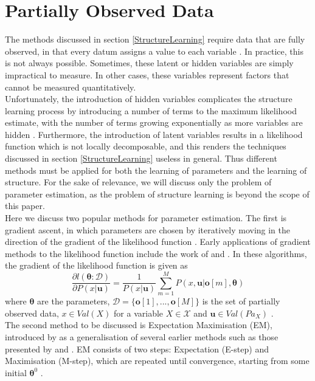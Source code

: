 \documentclass [11pt]{article}
\begin{document}
\section{Partially Observed Data}\label{PartiallyObservedData}
The methods discussed in section \ref{StructureLearning} require data that are fully observed, in that every datum assigns a value to each variable \citep{koller09}. In practice, this is not always possible. Sometimes, these latent or hidden variables are simply impractical to measure. In other cases, these variables represent factors that cannot be measured quantitatively. 
\\
Unfortunately, the introduction of hidden variables complicates the structure learning process by introducing a number of terms to the maximum likelihood estimate, with the number of terms growing exponentially as more variables are hidden \citep{koller09}. Furthermore, the introduction of latent variables results in a likelihood function which is not locally decomposable, and this renders the techniques discussed in section \ref{StructureLearning} useless in general. Thus different methods must be applied for both the learning of parameters and the learning of structure. For the sake of relevance, we will discuss only the problem of parameter estimation, as the problem of structure learning is beyond the scope of this paper.
\\
Here we discuss two popular methods for parameter estimation. The first is gradient ascent, in which parameters are chosen by iteratively moving in the direction of the gradient of the likelihood function \citep{koller09}. Early applications of gradient methods to the likelihood function include the work of \cite{thiesson95} and \cite{binder97}. In these algorithms, the gradient of the likelihood function is given as
\begin{equation*}
\frac{\partial l(\boldsymbol{\theta}:\mathcal{D})}{\partial P(x|\boldsymbol{u})} = \frac{1}{P(x|\boldsymbol{u})}\sum_{m=1}^{M}P(x,\boldsymbol{u}|\boldsymbol{o}[m],\boldsymbol{\theta})
\end{equation*}
where $\boldsymbol{\theta}$ are the parameters, $\mathcal{D} = \{\boldsymbol{o}[1],...,\boldsymbol{o}[M]\}$ is the set of partially observed data, $x \in Val(X)$ for a variable $X \in \mathcal{X}$ and $\boldsymbol{u} \in Val(Pa_{X})$ \citep{koller09}.
\\
The second method to be discussed is Expectation Maximisation (EM), introduced by \cite{dempster77} as a generalisation of several earlier methods such as those presented by \cite{baum70} and \cite{orchard72}. EM consists of two steps: Expectation (E-step) and Maximisation (M-step), which are repeated until convergence, starting from some initial $\boldsymbol{\theta}^{0}$  \citep{koller09}. 
\end{document}
